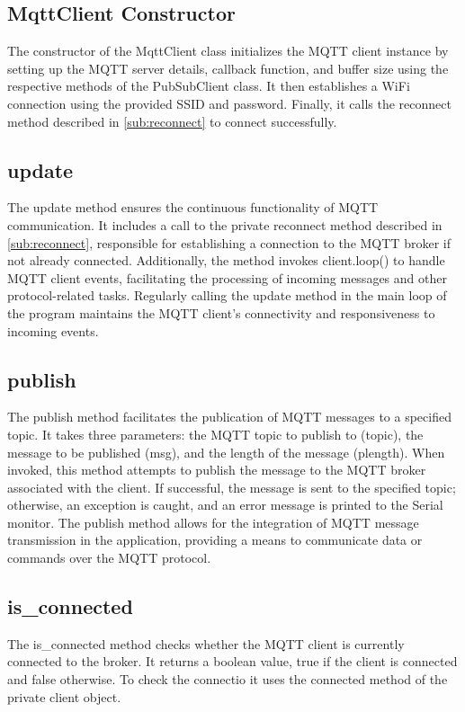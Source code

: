 \subsection{MqttClient Constructor}
\label{sub:MqttClient_Constructor}
The constructor of the MqttClient class initializes the MQTT client instance by setting up the MQTT server details, callback function, and buffer size using the respective methods of the PubSubClient class. 
It then establishes a WiFi connection using the provided SSID and password. 
Finally, it calls the reconnect method described in \ref{sub:reconnect} to connect successfully. 

\subsection{update}
\label{sub:update}
The update method ensures the continuous functionality of MQTT communication. 
It includes a call to the private reconnect method described in \ref{sub:reconnect}, responsible for establishing a connection to the MQTT broker if not already connected. 
Additionally, the method invokes client.loop() to handle MQTT client events, facilitating the processing of incoming messages and other protocol-related tasks. 
Regularly calling the update method in the main loop of the program maintains the MQTT client's connectivity and responsiveness to incoming events.

\subsection{publish}
\label{sub:publish}
The publish method facilitates the publication of MQTT messages to a specified topic. 
It takes three parameters: the MQTT topic to publish to (topic), the message to be published (msg), and the length of the message (plength). 
When invoked, this method attempts to publish the message to the MQTT broker associated with the client. 
If successful, the message is sent to the specified topic; otherwise, an exception is caught, and an error message is printed to the Serial monitor. 
The publish method allows for the integration of MQTT message transmission in the application, providing a means to communicate data or commands over the MQTT protocol.

\subsection{is\_connected}
\label{sub:is_connected}
The is\_connected method checks whether the MQTT client is currently connected to the broker. 
It returns a boolean value, true if the client is connected and false otherwise. 
To check the connectio it uses the connected method of the private client object. 

